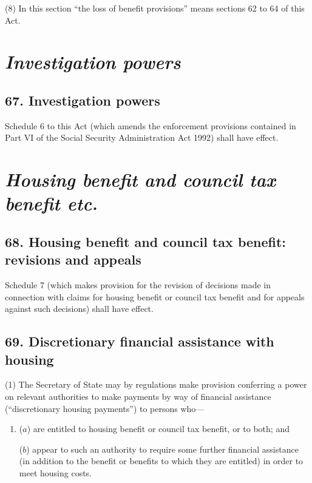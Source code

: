\documentclass[12pt,a4paper]{article}
\begin{document}
(8) In this section “the loss of benefit provisions” means sections 62 to 64 of this Act.
%
%


\section{\itshape Investigation powers}

\subsection{67. Investigation powers}

Schedule 6 to this Act (which amends the enforcement provisions contained in Part VI of the Social Security Administration Act 1992) shall have effect.

\section{\itshape Housing benefit and council tax benefit etc.}

\subsection{68. Housing benefit and council tax benefit: revisions and appeals}

Schedule 7 (which makes provision for the revision of decisions made in connection with claims for housing benefit or council tax benefit and for appeals against such decisions) shall have effect.

\subsection{69. Discretionary financial assistance with housing}

(1) The Secretary of State may by regulations make provision conferring a power on relevant authorities to make payments by way of financial assistance (“discretionary housing payments”) to persons who—
\begin{enumerate}\item[]
($a$) are entitled to housing benefit or council tax benefit, or to both; and

($b$) appear to such an authority to require some further financial assistance (in addition to the benefit or benefits to which they are entitled) in order to meet housing costs.
\end{enumerate}
\end{document}
